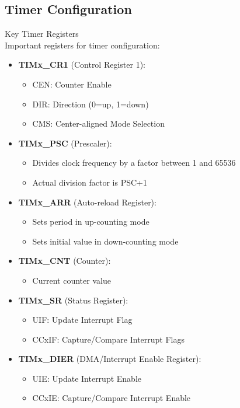 \subsection{Timer Configuration}

\begin{definition}{Key Timer Registers}\\
Important registers for timer configuration:
\begin{itemize}
    \item \textbf{TIMx\_CR1} (Control Register 1):
    \begin{itemize}
        \item CEN: Counter Enable
        \item DIR: Direction (0=up, 1=down)
        \item CMS: Center-aligned Mode Selection
    \end{itemize}
    \item \textbf{TIMx\_PSC} (Prescaler):
    \begin{itemize}
        \item Divides clock frequency by a factor between 1 and 65536
        \item Actual division factor is PSC+1
    \end{itemize}
    \item \textbf{TIMx\_ARR} (Auto-reload Register):
    \begin{itemize}
        \item Sets period in up-counting mode
        \item Sets initial value in down-counting mode
    \end{itemize}
    \item \textbf{TIMx\_CNT} (Counter):
    \begin{itemize}
        \item Current counter value
    \end{itemize}
    \item \textbf{TIMx\_SR} (Status Register):
    \begin{itemize}
        \item UIF: Update Interrupt Flag
        \item CCxIF: Capture/Compare Interrupt Flags
    \end{itemize}
    \item \textbf{TIMx\_DIER} (DMA/Interrupt Enable Register):
    \begin{itemize}
        \item UIE: Update Interrupt Enable
        \item CCxIE: Capture/Compare Interrupt Enable
    \end{itemize}
\end{itemize}
\end{definition}

